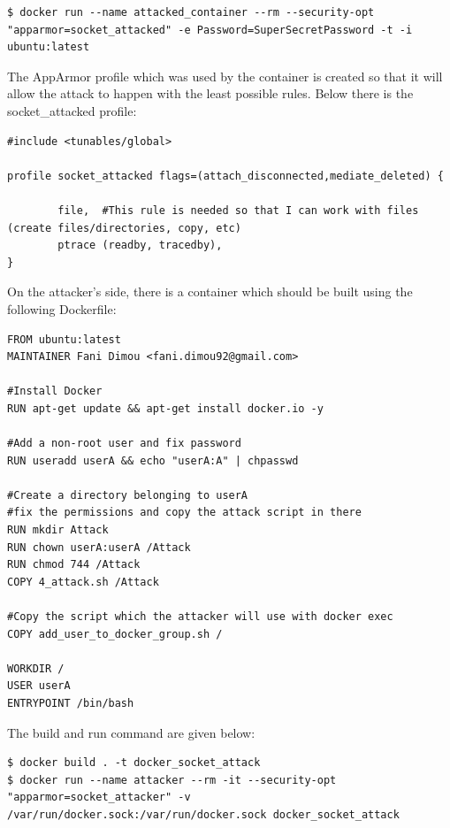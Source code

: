 \begin{lstlisting}[style=dockercommands]
$ docker run --name attacked_container --rm --security-opt "apparmor=socket_attacked" -e Password=SuperSecretPassword -t -i ubuntu:latest
\end{lstlisting}

The AppArmor profile which was used by the container is created so that it will allow the attack to happen with the least possible rules. Below there is the socket\_attacked profile:

\begin{lstlisting}[style=Dockerfile, caption={AppArmor profile socket\_attacked}]
#include <tunables/global>

profile socket_attacked flags=(attach_disconnected,mediate_deleted) {

        file,  #This rule is needed so that I can work with files (create files/directories, copy, etc)
        ptrace (readby, tracedby),
}
\end{lstlisting}

On the attacker's side, there is a container which should be built using the following Dockerfile:

\begin{lstlisting}[style=Dockerfile, caption={Dockerfile for attacked container's image}]
FROM ubuntu:latest
MAINTAINER Fani Dimou <fani.dimou92@gmail.com>

#Install Docker
RUN apt-get update && apt-get install docker.io -y

#Add a non-root user and fix password
RUN useradd userA && echo "userA:A" | chpasswd

#Create a directory belonging to userA
#fix the permissions and copy the attack script in there
RUN mkdir Attack
RUN chown userA:userA /Attack
RUN chmod 744 /Attack
COPY 4_attack.sh /Attack

#Copy the script which the attacker will use with docker exec
COPY add_user_to_docker_group.sh /

WORKDIR /
USER userA
ENTRYPOINT /bin/bash
\end{lstlisting}

The build and run command are given below:

\begin{lstlisting}[style=dockercommands]
$ docker build . -t docker_socket_attack
$ docker run --name attacker --rm -it --security-opt "apparmor=socket_attacker" -v /var/run/docker.sock:/var/run/docker.sock docker_socket_attack
\end{lstlisting}

